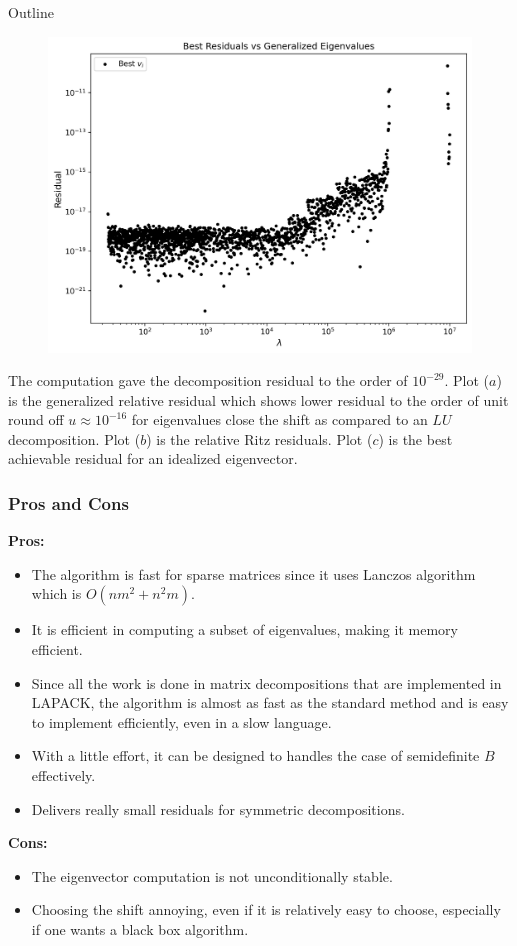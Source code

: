 \documentclass[landscape]{beamer}
\begin{document}
\begin{frame}[allowframebreaks]{Outline}
\begin{figure}
	\vspace{2ex}  %
	
	\centering
	\includegraphics[scale=.25]{./Plots/eigdecomp/residual_eig_bs.png}
	\subcaption{}
\end{figure}
	
	The computation gave the decomposition residual to the order of $10^{-29}$. Plot ($a$) is the generalized relative residual which shows lower residual to the order of unit round off $u \approx10^{-16}$ for eigenvalues close the shift as compared to an $LU$ decomposition. Plot ($b$) is the relative Ritz residuals. Plot ($c$) is the best achievable residual for an idealized eigenvector.
\end{frame}
\begin{frame}
  \frametitle{Pros and Cons}
  
  {\bf Pros:}
  \begin{itemize}
  \item The algorithm is fast for sparse matrices since it uses Lanczos algorithm which is $O(nm^2 + n^2m)$.
  \item It is efficient in computing a subset of eigenvalues, making it memory efficient.
  \item Since all the work is done in matrix decompositions that are
    implemented in LAPACK, the algorithm is almost as fast as the
    standard method and is easy to implement efficiently, even in a
    slow language.
  \item With a little effort, it can be designed to handles the case of semidefinite $B$ effectively.
  \item Delivers really small residuals for symmetric decompositions.
  \end{itemize}

  {\bf Cons:}
  \begin{itemize}
  \item The eigenvector computation is not unconditionally stable.
  \item Choosing the shift annoying, even if it is relatively easy to
    choose, especially if one wants a black box algorithm.
  \end{itemize}
\end{frame}
\end{document}
